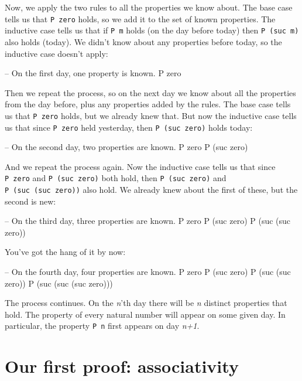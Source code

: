 Now, we apply the two rules to all the properties we know about. The
base case tells us that \texttt{P\ zero} holds, so we add it to the set
of known properties. The inductive case tells us that if \texttt{P\ m}
holds (on the day before today) then \texttt{P\ (suc\ m)} also holds
(today). We didn't know about any properties before today, so the
inductive case doesn't apply:

\begin{myDisplay}
-- On the first day, one property is known.
P zero
\end{myDisplay}

Then we repeat the process, so on the next day we know about all the
properties from the day before, plus any properties added by the rules.
The base case tells us that \texttt{P\ zero} holds, but we already knew
that. But now the inductive case tells us that since \texttt{P\ zero}
held yesterday, then \texttt{P\ (suc\ zero)} holds today:

\begin{myDisplay}
-- On the second day, two properties are known.
P zero
P (suc zero)
\end{myDisplay}

And we repeat the process again. Now the inductive case tells us that
since \texttt{P\ zero} and \texttt{P\ (suc\ zero)} both hold, then
\texttt{P\ (suc\ zero)} and \texttt{P\ (suc\ (suc\ zero))} also hold. We
already knew about the first of these, but the second is new:

\begin{myDisplay}
-- On the third day, three properties are known.
P zero
P (suc zero)
P (suc (suc zero))
\end{myDisplay}

You've got the hang of it by now:

\begin{myDisplay}
-- On the fourth day, four properties are known.
P zero
P (suc zero)
P (suc (suc zero))
P (suc (suc (suc zero)))
\end{myDisplay}

The process continues. On the \emph{n}'th day there will be \emph{n}
distinct properties that hold. The property of every natural number will
appear on some given day. In particular, the property \texttt{P\ n}
first appears on day \emph{n+1}.

\hypertarget{our-first-proof-associativity}{%
\section{Our first proof:
associativity}\label{our-first-proof-associativity}}

